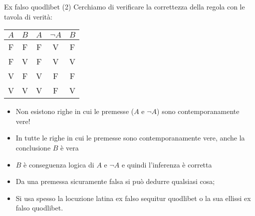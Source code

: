 \documentclass[aspectratio=169,10pt,dvipsnames,xcolor=table,handout]{beamer}
\begin{document}
\begin{frame}{Ex falso quodlibet (2)}
    Cerchiamo di verificare la correttezza della regola con le tavola di verità:
    \smallskip
    \begin{center}
        \begin{tabular}{|c|c||c|c|c|}
            $A$ & $B$ & $A$ & $\neg A$ & $B$ \\
            \hline
            F   & F   & F   & V        & F   \\
            F   & V   & F   & V        & V   \\
            V   & F   & V   & F        & F   \\
            V   & V   & V   & F        & V
        \end{tabular}
    \end{center}

    \begin{itemize}
        \item<2-> Non esistono righe in cui le premesse ($A$ e $\neg A$) sono contemporanamente vere!
        \item<3-> In tutte le righe in cui le premesse sono contemporanamente vere, anche la conclusione $B$ è vera
        \item<4-> $B$ è conseguenza logica di $A$ e $\neg A$ e quindi l'inferenza è corretta
    \end{itemize}

    \begin{itemize}
        \item<5-> Da una premessa sicuramente falsa si può dedurre qualsiasi cosa;
        \item<6-> Si usa spesso la locuzione latina \alert{ex falso sequitur quodlibet} o la sua ellissi \alert{ex falso quodlibet}.
    \end{itemize}
\end{frame}
\end{document}
